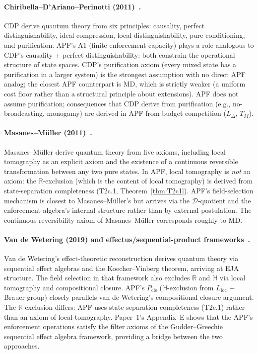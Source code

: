 \documentclass[11pt,a4paper]{article}
\theoremstyle{definition}
\begin{document}
\paragraph{Chiribella--D'Ariano--Perinotti (2011)~\cite{CDP2011}.}
CDP derive quantum theory from six principles: causality, perfect distinguishability, ideal compression, local distinguishability, pure conditioning, and purification.  APF's A1 (finite enforcement capacity) plays a role analogous to CDP's causality + perfect distinguishability: both constrain the operational structure of state spaces.  CDP's purification axiom (every mixed state has a purification in a larger system) is the strongest assumption with no direct APF analog; the closest APF counterpart is MD, which is strictly weaker (a uniform cost floor rather than a structural principle about extensions).  APF does not assume purification; consequences that CDP derive from purification (e.g., no-broadcasting, monogamy) are derived in APF from budget competition ($L_\Delta$, $T_M$).

\paragraph{Masanes--M\"uller (2011)~\cite{MM2011}.}
Masanes--M\"uller derive quantum theory from five axioms, including local tomography as an explicit axiom and the existence of a continuous reversible transformation between any two pure states.  In APF, local tomography is \emph{not} an axiom: the $\mathbb{R}$-exclusion (which is the content of local tomography) is derived from state-separation completeness (T2c.1, Theorem~\ref{thm:T2c1}).  APF's field-selection mechanism is closest to Masanes--M\"uller's but arrives via the $\mathcal{D}$-quotient and the enforcement algebra's internal structure rather than by external postulation.  The continuous-reversibility axiom of Masanes--M\"uller corresponds roughly to MD.

\paragraph{Van de Wetering (2019) and effectus/sequential-product frameworks~\cite{vandeWetering2019,GudderGreechie2002}.}
Van de Wetering's effect-theoretic reconstruction derives quantum theory via sequential effect algebras and the Koecher--Vinberg theorem, arriving at EJA structure.  The field selection in that framework also excludes $\mathbb{R}$ and $\mathbb{H}$ via local tomography and compositional closure.  APF's $P_{\mathrm{cls}}$ ($\mathbb{H}$-exclusion from $L_{\mathrm{loc}}$ + Brauer group) closely parallels van de Wetering's compositional closure argument.  The $\mathbb{R}$-exclusion differs: APF uses state-separation completeness (T2c.1) rather than an axiom of local tomography.  Paper~1's Appendix~E shows that the APF's enforcement operations satisfy the filter axioms of the Gudder--Greechie sequential effect algebra framework, providing a bridge between the two approaches.
\end{document}
